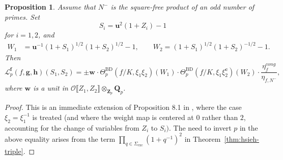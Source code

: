 \documentclass[10pt,letterpaper]{amsart}
\theoremstyle{plain}
\theoremstyle{definition}
\theoremstyle{definition}
\theoremstyle{plain}
\newtheorem{prop}[thm]{Proposition}
\theoremstyle{plain}
\theoremstyle{plain}
\theoremstyle{remark}
\numberwithin{equation}{section}
\newcommand{\cc}{\mathbf{c}}
\newcommand{\ch}{\xi}
\newcommand{\pp}{\mathfrak{p}}
\DeclareMathOperator{\BD}{BD} %
\def\cO{\mathcal O}
\newcommand{\unb}{{\boldsymbol{f}}}
\newcommand{\Q}{\mathbf{Q}}
\newcommand{\Z}{\mathbf{Z}}
\def\x{{\times}}
\def\al{\alpha}
\newcommand{\dBr}[1]{\llbracket{#1}\rrbracket}
\newcommand{\bfg}{{\boldsymbol{g}}}
\newcommand{\bfh}{{\boldsymbol{h}}}
\begin{document}
\begin{prop}\label{prop:factor-L-def}
Assume that $N^-$ is the square-free product of an odd number of primes. Set
\[
S_i=\mathbf{u}^2(1+Z_i)-1
\]
for $i=1,2$, and
\begin{align*}
    W_1&=\mathbf{u}^{-1}(1+S_1)^{1/2}(1+S_2)^{1/2}-1,\quad\quad
    W_2=(1+S_1)^{1/2}(1+S_2)^{-1/2}-1.
\end{align*}
Then 
\[
\mathscr{L}_p^{\unb}(f,\bfg,\bfh)(S_1,S_2)=
\pm\mathbf{w}^{}\cdot\Theta_p^{\BD}(f/K,\ch_1\ch_2)(W_1)\cdot\Theta_p^{\BD}(f/K,\ch_1\ch_2^\cc)(W_2)\cdot\frac{\eta_{f}^{cong}}{\eta_{f,N^-}},
\]
where $\mathbf{w}$ is a unit in $\cO\dBr{Z_1,Z_2}\otimes_{\Z_p}\Q_p$.
\end{prop}

\begin{proof} 	
This is an immediate extension of Proposition 8.1 in \cite{hsieh-triple}, where the case $\ch_2=\ch_1^{-1}$ is treated (and where the weight map is centered at $0$ rather than $2$, accounting for the change of variables from $Z_i$ to $S_i)$. The need to invert $p$ in the above equality arises from the term $\prod_{q\in\Sigma_{\mathrm{exc}}}(1+q^{-1})^2$ in Theorem~\ref{thm:hsieh-triple}. 
%
%
\end{proof}
\end{document}
